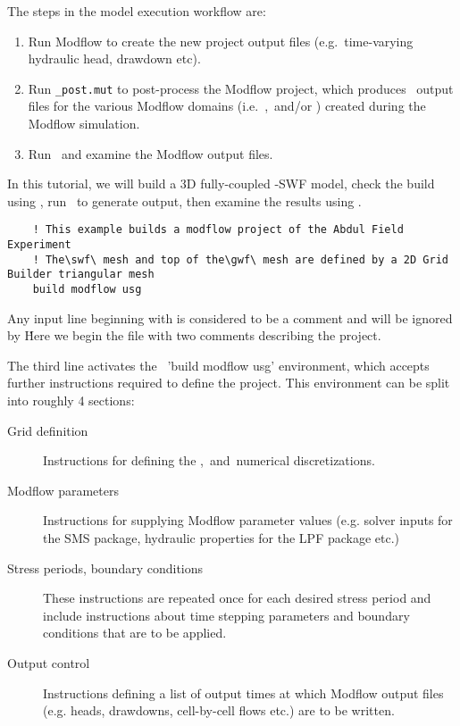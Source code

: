 \label{chapter:ModelExecution} 

The steps in the model execution workflow are:
\begin{enumerate}
    \item Run Modflow to create the new project output files (e.g.\ time-varying hydraulic head, drawdown etc).\label{step:modflow}
    \item Run \verb+_post.mut+ to post-process the Modflow project, which produces \tecplot\ output files for the various Modflow domains (i.e.\ \gwf,\swf\ and/or \cln ) created during the Modflow simulation.\label{step:mut2}
    \item Run \tecplot\ and examine the Modflow output files.   \label{step:Tecplot2}
\end{enumerate}
In this tutorial, we will build a 3D fully-coupled \gwf -SWF model, check the build using \tecplot, run \mfus\ to generate output, then examine the results using \tecplot.

\begin{verbatim}
    ! This example builds a modflow project of the Abdul Field Experiment
    ! The\swf\ mesh and top of the\gwf\ mesh are defined by a 2D Grid Builder triangular mesh
    build modflow usg
\end{verbatim}

Any input line beginning with  is considered to be a comment and will be ignored by \mut\.  Here we begin the file with two comments describing the project.

The third line activates the \mut\ 'build modflow usg' environment, which accepts further instructions required to define the project. This environment can be split into roughly 4 sections:
\begin{description}
    \item[Grid definition] Instructions for defining the \gwf,\swf\ and\cln\ numerical discretizations.
    \item[Modflow parameters] Instructions for supplying Modflow parameter values (e.g. solver inputs for the SMS package, hydraulic properties for the LPF package etc.)
    \item[Stress periods, boundary conditions] These instructions are repeated once for each desired stress period and include instructions about time stepping parameters and boundary conditions that are to be applied.
    \item[Output control] Instructions defining a list of output times at which Modflow output files (e.g. heads, drawdowns, cell-by-cell flows etc.) are to be written.
\end{description}


